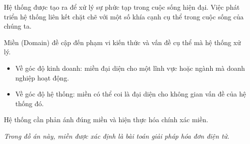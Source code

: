 Hệ thống được tạo ra để xử lý sự phức tạp trong cuộc sống hiện đại. Việc phát triển hệ thống liên kết chặt chẽ với một số khía cạnh cụ thể trong cuộc sống của chúng ta.

Miền (Domain) đề cập đến phạm vi kiến thức và vấn đề cụ thể mà hệ thống xử lý.

\begin{itemize}

\item Về góc độ kinh doanh: miền đại diện cho một lĩnh vực hoặc ngành mà doanh nghiệp hoạt động.

\item Về góc độ hệ thống: miền có thể coi là đại diện cho không gian vấn đề của hệ thống đó.

\end{itemize}

Hệ thống cần phản ánh đúng miền và hiện thực hóa chính xác miền.

\textit{Trong đồ án này, miền được xác định là bài toán giải pháp hóa đơn điện tử.}


